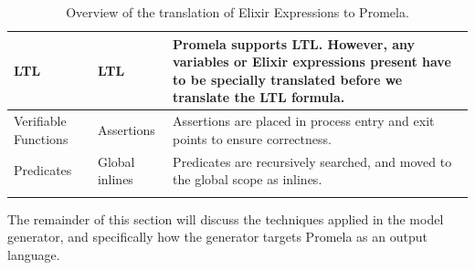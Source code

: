 \begin{longtable}{|>{\raggedright\arraybackslash}p{4cm}|>{\raggedright\arraybackslash}p{4cm}|>{\raggedright\arraybackslash}p{6cm}|}
        \hline
        LTL & LTL & Promela supports LTL. However, any variables or Elixir expressions present have to be specially translated before we translate the LTL formula. \\
        \hline
        Verifiable Functions & Assertions & Assertions are placed in process entry and exit points to ensure correctness. \\
        \hline
        Predicates & Global inlines & Predicates are recursively searched, and moved to the global scope as inlines. \\
        \hline
    \caption{Overview of the translation of Elixir Expressions to Promela.}
    \label{table:translation}
\end{longtable}
The remainder of this section will discuss the techniques applied in the model generator, and specifically how the generator targets Promela as an output language.
